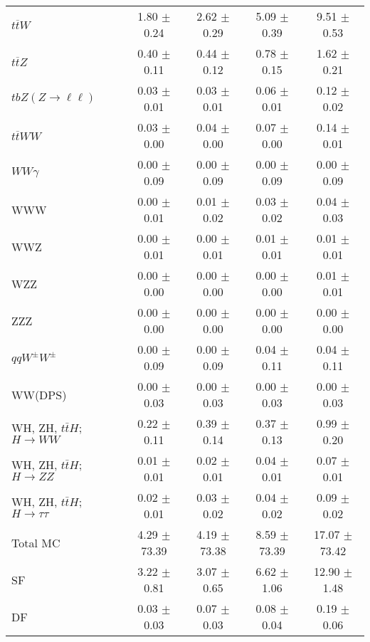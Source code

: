 \begin{tabular}{l|cccc}
                   $t\overline{t}W$ &  1.80 $\pm$  0.24 &  2.62 $\pm$  0.29 &  5.09 $\pm$  0.39 &  9.51 $\pm$  0.53 \\
                   $t\overline{t}Z$ &  0.40 $\pm$  0.11 &  0.44 $\pm$  0.12 &  0.78 $\pm$  0.15 &  1.62 $\pm$  0.21 \\
    $tbZ (Z \rightarrow \ell \ell)$ &  0.03 $\pm$  0.01 &  0.03 $\pm$  0.01 &  0.06 $\pm$  0.01 &  0.12 $\pm$  0.02 \\
                  $t\overline{t}WW$ &  0.03 $\pm$  0.00 &  0.04 $\pm$  0.00 &  0.07 $\pm$  0.00 &  0.14 $\pm$  0.01 \\
                         $WW\gamma$ &  0.00 $\pm$  0.09 &  0.00 $\pm$  0.09 &  0.00 $\pm$  0.09 &  0.00 $\pm$  0.09 \\
                                WWW &  0.00 $\pm$  0.01 &  0.01 $\pm$  0.02 &  0.03 $\pm$  0.02 &  0.04 $\pm$  0.03 \\
                                WWZ &  0.00 $\pm$  0.01 &  0.00 $\pm$  0.01 &  0.01 $\pm$  0.01 &  0.01 $\pm$  0.01 \\
                                WZZ &  0.00 $\pm$  0.00 &  0.00 $\pm$  0.00 &  0.00 $\pm$  0.00 &  0.01 $\pm$  0.01 \\
                                ZZZ &  0.00 $\pm$  0.00 &  0.00 $\pm$  0.00 &  0.00 $\pm$  0.00 &  0.00 $\pm$  0.00 \\
                 $qqW^{\pm}W^{\pm}$ &  0.00 $\pm$  0.09 &  0.00 $\pm$  0.09 &  0.04 $\pm$  0.11 &  0.04 $\pm$  0.11 \\
                            WW(DPS) &  0.00 $\pm$  0.03 &  0.00 $\pm$  0.03 &  0.00 $\pm$  0.03 &  0.00 $\pm$  0.03 \\
WH, ZH, $t\bar{t}H$; $H \rightarrow WW$ &  0.22 $\pm$  0.11 &  0.39 $\pm$  0.14 &  0.37 $\pm$  0.13 &  0.99 $\pm$  0.20 \\
WH, ZH, $t\bar{t}H$; $H \rightarrow ZZ$ &  0.01 $\pm$  0.01 &  0.02 $\pm$  0.01 &  0.04 $\pm$  0.01 &  0.07 $\pm$  0.01 \\
WH, ZH, $t\bar{t}H$; $H \rightarrow \tau\tau$ &  0.02 $\pm$  0.01 &  0.03 $\pm$  0.02 &  0.04 $\pm$  0.02 &  0.09 $\pm$  0.02 \\
\hline\hline
                           Total MC &  4.29 $\pm$ 73.39 &  4.19 $\pm$ 73.38 &  8.59 $\pm$ 73.39 & 17.07 $\pm$ 73.42 \\
\hline
                                 SF &  3.22 $\pm$  0.81 &  3.07 $\pm$  0.65 &  6.62 $\pm$  1.06 & 12.90 $\pm$  1.48 \\
                                 DF &  0.03 $\pm$  0.03 &  0.07 $\pm$  0.03 &  0.08 $\pm$  0.04 &  0.19 $\pm$  0.06 \\

\end{tabular}
